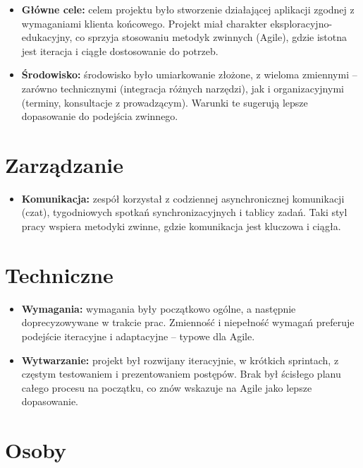 \documentclass[12pt,a4paper,colorlinks=true,linkcolor=NavyBlue,citecolor=red,urlcolor=NavyBlue]{book}
\begin{document}
\begin{itemize}
  \item \textbf{Główne cele:} celem projektu było stworzenie działającej aplikacji zgodnej z wymaganiami klienta końcowego. Projekt miał charakter eksploracyjno-edukacyjny, co sprzyja stosowaniu metodyk zwinnych (Agile), gdzie istotna jest iteracja i ciągłe dostosowanie do potrzeb.
  
  \item \textbf{Środowisko:} środowisko było umiarkowanie złożone, z wieloma zmiennymi – zarówno technicznymi (integracja różnych narzędzi), jak i organizacyjnymi (terminy, konsultacje z prowadzącym). Warunki te sugerują lepsze dopasowanie do podejścia zwinnego.
\end{itemize}

\section{Zarządzanie}

\begin{itemize}
  \item \textbf{Komunikacja:} zespół korzystał z codziennej asynchronicznej komunikacji (czat), tygodniowych spotkań synchronizacyjnych i tablicy zadań. Taki styl pracy wspiera metodyki zwinne, gdzie komunikacja jest kluczowa i ciągła.
\end{itemize}

\section{Techniczne}

\begin{itemize}
  \item \textbf{Wymagania:} wymagania były początkowo ogólne, a następnie doprecyzowywane w trakcie prac. Zmienność i niepełność wymagań preferuje podejście iteracyjne i adaptacyjne – typowe dla Agile.
  
  \item \textbf{Wytwarzanie:} projekt był rozwijany iteracyjnie, w krótkich sprintach, z częstym testowaniem i prezentowaniem postępów. Brak był ścisłego planu całego procesu na początku, co znów wskazuje na Agile jako lepsze dopasowanie.
\end{itemize}

\section{Osoby}
\end{document}
